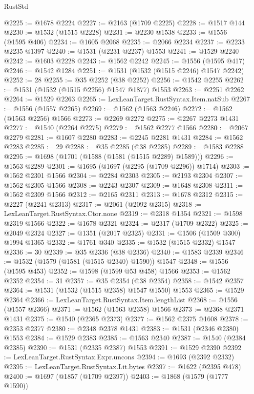 \begin{lexlean}{RustStd}
\begin{coremodule}
{\begin{coremodule}
{{{{{{{{{{{{{{{{{{{{{{{{{{{{{{{{@2225 := @1678 @2224
@2227 := @2163 (@1709 @2225)
@2228 := @1517 @144
@2230 := @1532 (@1515 @2228)
@2231 := @2230 @1538
@2233 := @1556 (@1595 @406)
@2234 := @1605 @2068
@2235 := @2066 @2234
@2237 := @2233 @2235 @1397
@2240 := @1531 (@2231 @2237) @1553
@2241 := @1529 @2240
@2242 := @1603 @2228
@2243 := @1562 @2242
@2245 := @1556 (@1595 @417)
@2246 := @1542 @1284
@2251 := @1531 (@1532 (@1515 @2246) @1547 @2242)
@2252 := 28
@2255 := @35 @2252 (@38 @2252)
@2256 := @1542 @2255
@2262 := @1531 (@1532 (@1515 @2256) @1547 @1877) @1553
@2263 := @2251 @2262
@2264 := @1529 @2263
@2265 := LexLeanTarget.RustSyntax.Item.natSub
@2267 := @1556 (@1557 @2265)
@2269 := @1562 (@1563 @2246)
@2272 := @1562 (@1563 @2256) @1566
@2273 := @2269 @2272
@2275 := @2267 @2273 @1431
@2277 := @1540 (@2264 @2275)
@2279 := @1562 @2277 @1566
@2280 := @2067 @2279
@2281 := @1607 @2280
@2283 := @2245 @2281 @1431
@2284 := @1562 @2283
@2285 := 29
@2288 := @35 @2285 (@38 @2285)
@2289 := @1583 @2288
@2295 := @1698 (@1701 (@1588 (@1581 (@1515 @2289) @1589)))
@2296 := @1563 @2289
@2301 := @1695 (@1697 (@2295 (@1709 @2296)) @1714)
@2303 := @1562 @2301 @1566
@2304 := @2284 @2303
@2305 := @2193 @2304
@2307 := @1562 @2305 @1566
@2308 := @2243 @2307
@2309 := @1648 @2308
@2311 := @1562 @2309 @1566
@2312 := @2165 @2311
@2313 := @1678 @2312
@2315 := @2227 (@2241 @2313)
@2317 := @2061 (@2092 @2315)
@2318 := LexLeanTarget.RustSyntax.Ctor.none
@2319 := @2318 @1354
@2321 := @1598 @2319 @1566
@2322 := @1678 @2321
@2324 := @2317 (@1709 @2322)
@2325 := @2049 @2324
@2327 := @1351 (@2017 @2325)
@2331 := @1506 (@1509 @300) @1994 @1365
@2332 := @1761 @340
@2335 := @1532 (@1515 @2332) @1547
@2336 := 30
@2339 := @35 @2336 (@38 @2336)
@2340 := @1583 @2339
@2346 := @1532 (@1579 (@1581 (@1515 @2340) @1590)) @1547
@2348 := @1556 (@1595 @453)
@2352 := @1598 (@1599 @53 @458) @1566
@2353 := @1562 @2352
@2354 := 31
@2357 := @35 @2354 (@38 @2354)
@2358 := @1542 @2357
@2364 := @1531 (@1532 (@1515 @2358) @1547 @1550) @1553
@2365 := @1529 @2364
@2366 := LexLeanTarget.RustSyntax.Item.lengthList
@2368 := @1556 (@1557 @2366)
@2371 := @1562 (@1563 @2358) @1566
@2373 := @2368 @2371 @1431
@2375 := @1540 (@2365 @2373)
@2377 := @1562 @2375 @1608
@2378 := @2353 @2377
@2380 := @2348 @2378 @1431
@2383 := @1531 (@2346 @2380) @1553
@2384 := @1529 @2383
@2385 := @1563 @2340
@2387 := @1540 (@2384 @2385)
@2390 := @1531 (@2335 @2387) @1553
@2391 := @1529 @2390
@2392 := LexLeanTarget.RustSyntax.Expr.uncons
@2394 := @1693 (@2392 @2332)
@2395 := LexLeanTarget.RustSyntax.Lit.bytes
@2397 := @1622 (@2395 @478)
@2400 := @1697 (@1857 (@1709 @2397))
@2403 := @1868 (@1579 (@1777 @1590))
}}}}}}}}}}}}}}}}}}}}}}}}}}}}}}}}
\end{coremodule}}
\end{coremodule}
\end{lexlean}
